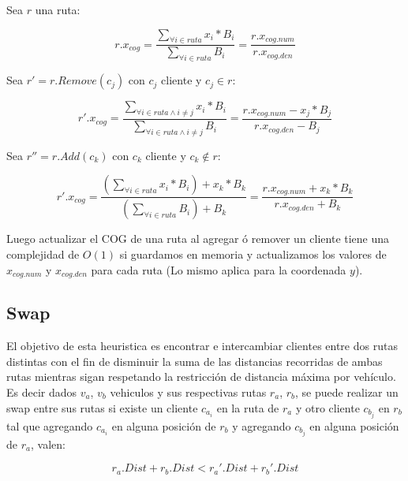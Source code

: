\bigskip

Sea $r$ una ruta:

\begin{equation}
r.x_{cog} =  \frac{\sum_{\forall i \in ruta} x_i * B_i}{\sum_{\forall i \in ruta} B_i}  = \frac{r.x_{cog.num}}{r.x_{cog.den}}
\end{equation}

\bigskip

Sea $r' = r.Remove(c_j)$ con $c_j$ cliente y $c_j \in r$:

\begin{equation}
r'.x_{cog} =  \frac{\sum_{\forall i \in ruta \wedge i \neq j} x_i * B_i}{\sum_{\forall i \in ruta \wedge i \neq j} B_i}  = \frac{r.x_{cog.num}-x_j*B_j}{r.x_{cog.den}-B_j}
\end{equation}

\bigskip

Sea $r'' = r.Add(c_k)$ con $c_k$ cliente y $c_k \notin r$:

\begin{equation}
r'.x_{cog} =  \frac{(\sum_{\forall i \in ruta} x_i * B_i) + x_k * B_k}{(\sum_{\forall i \in ruta} B_i) + B_k}  = \frac{r.x_{cog.num}+x_k*B_k}{r.x_{cog.den}+B_k}
\end{equation}

\bigskip

Luego actualizar el COG de una ruta al agregar ó remover un cliente tiene una complejidad de $O(1)$ si guardamos en memoria y actualizamos los valores de $x_{cog.num}$ y $x_{cog.den}$ para cada ruta (Lo mismo aplica para la coordenada $y$).

\bigskip



\subsection{Swap}

El objetivo de esta heuristica es encontrar e intercambiar clientes entre dos rutas distintas con el fin de disminuir la suma de las distancias recorridas de ambas rutas mientras sigan respetando la restricción de distancia máxima por vehículo. Es decir dados $v_a$, $v_b$ vehiculos y sus respectivas rutas $r_a$, $r_b$, se puede realizar un swap entre sus rutas si existe un cliente $c_{a_i}$ en la ruta de $r_a$ y otro cliente $c_{b_j}$ en $r_b$ tal que agregando $c_{a_i}$ en alguna posición de $r_b$ y agregando $c_{b_j}$ en alguna posición de $r_a$, valen:

\begin{equation*}
r_a.Dist + r_b.Dist < r_a'.Dist + r_b'.Dist \nonumber
\end{equation*}

